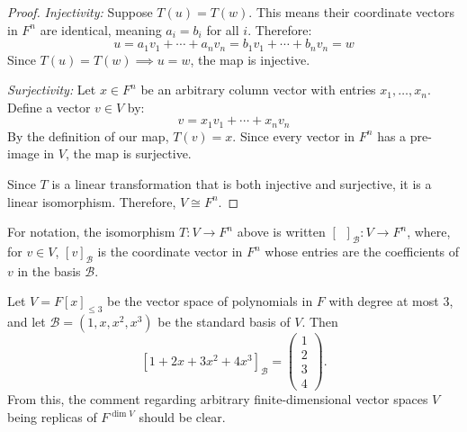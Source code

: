 \documentclass[../linear_algebra_and_groups.tex]{subfiles}
\begin{document}
\begin{proof}
    \textit{Injectivity:} Suppose $T(u) = T(w)$. This means their coordinate vectors in $F^n$ are identical, meaning $a_i = b_i$ for all $i$. Therefore:
    \[ u = a_1v_1 + \cdots + a_nv_n = b_1v_1 + \cdots + b_nv_n = w \]
    Since $T(u) = T(w) \implies u = w$, the map is injective.
    
    \textit{Surjectivity:} Let $x \in F^n$ be an arbitrary column vector with entries $x_1, \dots, x_n$. Define a vector $v \in V$ by:
    \[ v = x_1v_1 + \cdots + x_nv_n \]
    By the definition of our map, $T(v) = x$. Since every vector in $F^n$ has a pre-image in $V$, the map is surjective.
    
    Since $T$ is a linear transformation that is both injective and surjective, it is a linear isomorphism. Therefore, $V \cong F^n$.
    \qedhere
\end{proof}

\begin{remark}
    For notation, the isomorphism $T:V\to F^n$ above is written $[\phantom{v}]_\mathcal{B}:V\to F^n$, where, for $v\in V$, $[v]_\mathcal{B}$ is the coordinate vector in $F^n$ whose entries are the coefficients of $v$ in the basis $\mathcal{B}$.
\end{remark}

\begin{example}
    Let $V=F[x]_{\le 3}$ be the vector space of polynomials in $F$ with degree at most 3, and let $\mathcal{B}=(1,x,x^2,x^3)$ be the standard basis of $V$. Then \[[1+2x+3x^2+4x^3]_\mathcal{B}=\begin{pmatrix}1\\2\\3\\4\end{pmatrix}.\]
    From this, the comment regarding arbitrary finite-dimensional vector spaces $V$ being replicas of $F^{\dim V}$ should be clear. 
\end{example}
\end{document}
